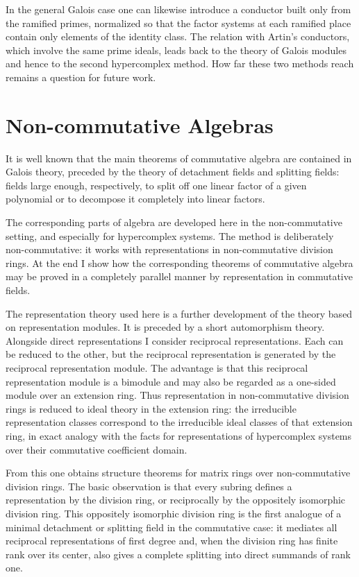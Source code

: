 \documentclass[11pt]{article}
\begin{document}
In the general Galois case one can likewise introduce a conductor built
only from the ramified primes, normalized so that the factor systems at
each ramified place contain only elements of the identity class. The
relation with Artin's conductors, which involve the same prime ideals,
leads back to the theory of Galois modules and hence to the second
hypercomplex method. How far these two methods reach remains a question
for future work.

\section{Non-commutative Algebras}\label{non-commutative-algebras}

It is well known that the main theorems of commutative algebra are
contained in Galois theory, preceded by the theory of detachment fields
and splitting fields: fields large enough, respectively, to split off
one linear factor of a given polynomial or to decompose it completely
into linear factors.

The corresponding parts of algebra are developed here in the
non-commutative setting, and especially for hypercomplex systems. The
method is deliberately non-commutative: it works with representations in
non-commutative division rings. At the end I show how the corresponding
theorems of commutative algebra may be proved in a completely parallel
manner by representation in commutative fields.

The representation theory used here is a further development of the
theory based on representation modules. It is preceded by a short
automorphism theory. Alongside direct representations I consider
reciprocal representations. Each can be reduced to the other, but the
reciprocal representation is generated by the reciprocal representation
module. The advantage is that this reciprocal representation module is a
bimodule and may also be regarded as a one-sided module over an
extension ring. Thus representation in non-commutative division rings is
reduced to ideal theory in the extension ring: the irreducible
representation classes correspond to the irreducible ideal classes of
that extension ring, in exact analogy with the facts for representations
of hypercomplex systems over their commutative coefficient domain.

From this one obtains structure theorems for matrix rings over
non-commutative division rings. The basic observation is that every
subring defines a representation by the division ring, or reciprocally
by the oppositely isomorphic division ring. This oppositely isomorphic
division ring is the first analogue of a minimal detachment or splitting
field in the commutative case: it mediates all reciprocal
representations of first degree and, when the division ring has finite
rank over its center, also gives a complete splitting into direct
summands of rank one.
\end{document}
